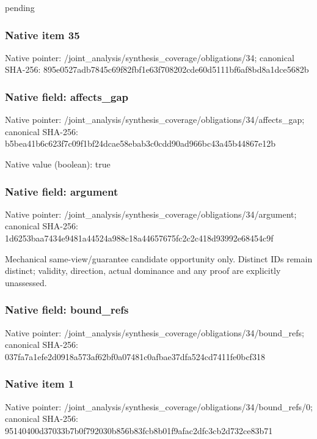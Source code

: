 \documentclass[10pt,a4paper]{article}
\begin{document}
\begingroup\raggedright\sloppy pending\par\endgroup

\subsubsection{Native item 35}
Native pointer: /joint\_\allowbreak{}analysis/synthesis\_\allowbreak{}coverage/obligations/34; canonical SHA-256: 895e0527adb7845c69f82fbf1e63f708202cde60d5111bf6af8bd8a1dce5682b

\subsubsection{Native field: affects\_\allowbreak{}gap}
Native pointer: /joint\_\allowbreak{}analysis/synthesis\_\allowbreak{}coverage/obligations/34/affects\_\allowbreak{}gap; canonical SHA-256: b5bea41b6c623f7c09f1bf24dcae58ebab3c0cdd90ad966bc43a45b44867e12b

Native value (boolean): true

\subsubsection{Native field: argument}
Native pointer: /joint\_\allowbreak{}analysis/synthesis\_\allowbreak{}coverage/obligations/34/argument; canonical SHA-256: 1d6253baa7434e9481a44524a988c18a44657675fc2c2c418d93992e68454c9f

\begingroup\raggedright\sloppy Mechanical same-view/\allowbreak{}guarantee candidate opportunity only. Distinct IDs remain distinct;\allowbreak{} validity,\allowbreak{} direction,\allowbreak{} actual dominance and any proof are explicitly unassessed.\par\endgroup

\subsubsection{Native field: bound\_\allowbreak{}refs}
Native pointer: /joint\_\allowbreak{}analysis/synthesis\_\allowbreak{}coverage/obligations/34/bound\_\allowbreak{}refs; canonical SHA-256: 037fa7a1efe2d0918a573af62bf0a07481c0afbae37dfa524cd7411fe0bcf318

\subsubsection{Native item 1}
Native pointer: /joint\_\allowbreak{}analysis/synthesis\_\allowbreak{}coverage/obligations/34/bound\_\allowbreak{}refs/0; canonical SHA-256: 95140400d37033b7b0f792030b856b83fcb8b01f9afac2dfc3cb2d732ce83b71
\end{document}
